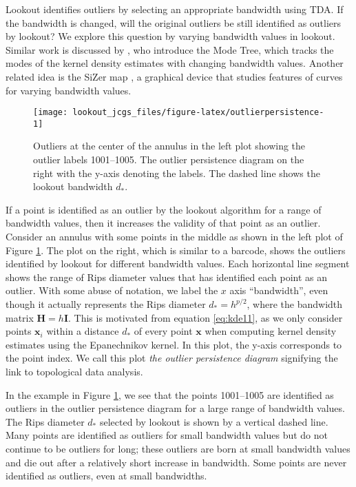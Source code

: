 \documentclass[12pt]{article}
\theoremstyle{definition}
\theoremstyle{definition}
\theoremstyle{definition}
\theoremstyle{definition}
\theoremstyle{remark}
\begin{document}
Lookout identifies outliers by selecting an appropriate bandwidth using TDA. If the bandwidth is changed, will the original outliers be still identified as outliers by lookout? We explore this question by varying bandwidth values in lookout. Similar work is discussed by \citet{Minnotte1993}, who introduce the Mode Tree, which tracks the modes of the kernel density estimates with changing bandwidth values. Another related idea is the SiZer map \citep{Chaudhuri1999}, a graphical device that studies features of curves for varying bandwidth values.

\begin{figure}
\texttt{[image: lookout\_jcgs\_files/figure-latex/outlierpersistence-1]} \caption{Outliers at the center of the annulus in the left plot showing the outlier labels 1001--1005. The outlier persistence diagram on the right with the y-axis denoting the labels. The dashed line shows the lookout bandwidth $d_*$.}\label{fig:outlierpersistence}
\end{figure}

If a point is identified as an outlier by the lookout algorithm for a range of bandwidth values, then it increases the validity of that point as an outlier. Consider an annulus with some points in the middle as shown in the left plot of Figure \ref{fig:outlierpersistence}. The plot on the right, which is similar to a barcode, shows the outliers identified by lookout for different bandwidth values. Each horizontal line segment shows the range of Rips diameter values that has identified each point as an outlier. With some abuse of notation, we label the \(x\) axis ``bandwidth'', even though it actually represents the Rips diameter \(d_* = h^{p/2}\), where the bandwidth matrix \(\bm{H} = h\bm{I}\). This is motivated from equation \eqref{eq:kde11}, as we only consider points \(\bm{x}_i\) within a distance \(d_*\) of every point \(\bm{x}\) when computing kernel density estimates using the Epanechnikov kernel. In this plot, the y-axis corresponds to the point index. We call this plot \emph{the outlier persistence diagram} signifying the link to topological data analysis.

In the example in Figure \ref{fig:outlierpersistence}, we see that the points 1001--1005 are identified as outliers in the outlier persistence diagram for a large range of bandwidth values. The Rips diameter \(d_*\) selected by lookout is shown by a vertical dashed line. Many points are identified as outliers for small bandwidth values but do not continue to be outliers for long; these outliers are born at small bandwidth values and die out after a relatively short increase in bandwidth. Some points are never identified as outliers, even at small bandwidths.
\end{document}
